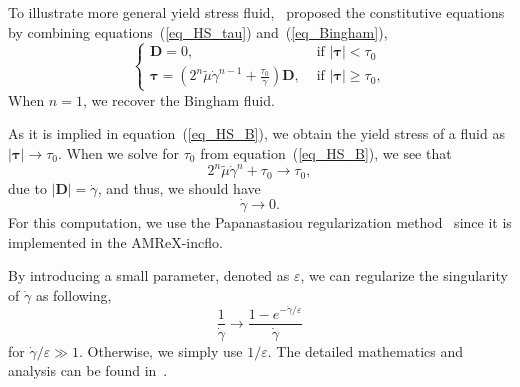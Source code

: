   To illustrate more general yield stress fluid,~\cite{sverdrup_highly_2018} proposed the constitutive equations by combining equations~(\ref{eq_HS_tau}) and~(\ref{eq_Bingham}),
  \begin{equation}
    \left\{\begin{matrix}
  {\bm D }=0, 
    & \text { if } |{\bm \tau}| < \tau_0 
    \\
    {\bm \tau}  =
    \left(2^n \tilde{\mu} \dot{\gamma}^{n-1} + \frac{\tau_0}{ \dot{\gamma}}\right) {\bm D}, 
    & \text { if } |{\bm \tau}|  \geq \tau_0,
  \end{matrix}\right. 
  \label{eq_HS_B}
   \end{equation}
When $n = 1$, we recover the Bingham fluid.
\par
As it is implied in equation~(\ref{eq_HS_B}), we obtain the yield stress of a fluid as $|\bm{\tau}| \rightarrow \tau_0$. 
When we solve for $\tau_0$ from equation~(\ref{eq_HS_B}), we see that 
\begin{equation}
2^n \tilde{\mu} \dot{\gamma}^{n} + \tau_0
\rightarrow \tau_0,
\end{equation}
due to $|\bm{D}| = \dot{\gamma}$, and thus, we should have 
\begin{equation}
  \dot{\gamma} \rightarrow 0.
\end{equation}
For this computation, we use the Papanastasiou regularization method~\cite{papanastasiou_flows_1987} since it is implemented in the AMReX-incflo. 
\par
By introducing a small parameter, denoted as $\varepsilon$, we can regularize the singularity of $\dot{\gamma}$ as following,
\begin{equation}
  \frac{1}{\dot{\gamma}} \rightarrow \frac{1-e^{-\dot{\gamma} / \varepsilon}}{\dot{\gamma}}  
\end{equation}
for $\dot{\gamma}/\varepsilon \gg 1$. Otherwise, we simply use $1/\varepsilon$. 
The detailed mathematics and analysis can be found in~\cite{sverdrup_highly_2018}.



